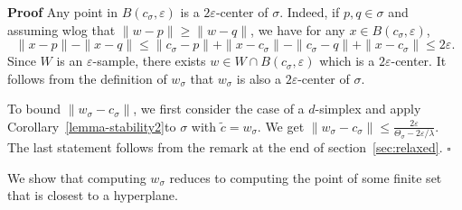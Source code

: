 \documentclass[11pt,a4paper]{article}
\newenvironment{proof}
        {\noindent \textbf{Proof} \hspace{0.3mm}}
        {\hspace{0.3mm}$\square$  \smallskip}
\newcommand{\e}{\varepsilon}
\begin{document}
\begin{proof}
Any point in $B(c_{\sigma}, \e)$ is a $2\e$-center of
$\sigma$. Indeed, if $p,q\in \sigma$ and assuming wlog that $\| w-p\|
\geq \| w-q\|$, we have for any $x\in B(c_{\sigma}, \e)$,
\[  \| x-p\| -\| x-q\|  \leq \| c_{\sigma}-p\| + \| x-c_{\sigma}\| - \| c_{\sigma}-q\| + \| x-c_{\sigma}\|
\leq 2\e.\]
Since
$W$ is an $\e$-sample, there exists $w\in W\cap B(c_{\sigma},\e)$
which is a $2\e$-center. It follows from the definition of $w_{\sigma}$
that $w_{\sigma}$ is also a
$2\e$-center of $\sigma$. 

To bound $\| w_{\sigma}-c_{\sigma}\|$, we first consider the case of a
$d$-simplex and apply Corollary~\ref{lemma-stability2}to $\sigma$ with
$\tilde{c}=w_{\sigma}$. We get $\| w_{\sigma}-c_{\sigma}\| \leq
\frac{2\e}{\Theta_{\sigma}- 2\e/\lambda}$.
The last statement follows from the remark at the end of section~\ref{sec:relaxed}.
\end{proof}



We show that computing $w_{\sigma}$ reduces to computing the
point of some finite set that is closest to a hyperplane.




\end{document}
